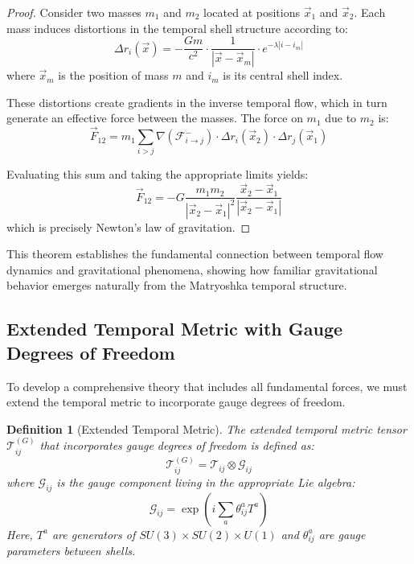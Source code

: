 \documentclass[12pt,a4paper]{article}
\newtheorem{definition}{Definition}[section]
\begin{document}
\begin{proof}
Consider two masses $m_1$ and $m_2$ located at positions $\vec{x}_1$ and $\vec{x}_2$. Each mass induces distortions in the temporal shell structure according to:
\begin{equation}
\Delta r_i(\vec{x}) = -\frac{G m}{c^2} \cdot \frac{1}{|\vec{x} - \vec{x}_m|} \cdot e^{-\lambda |i - i_m|}
\end{equation}
where $\vec{x}_m$ is the position of mass $m$ and $i_m$ is its central shell index.

These distortions create gradients in the inverse temporal flow, which in turn generate an effective force between the masses. The force on $m_1$ due to $m_2$ is:
\begin{equation}
\vec{F}_{12} = m_1 \sum_{i > j} \nabla(\mathcal{F}^-_{i \to j}) \cdot \Delta r_i(\vec{x}_2) \cdot \Delta r_j(\vec{x}_1)
\end{equation}

Evaluating this sum and taking the appropriate limits yields:
\begin{equation}
\vec{F}_{12} = -G \frac{m_1 m_2}{|\vec{x}_2 - \vec{x}_1|^2} \frac{\vec{x}_2 - \vec{x}_1}{|\vec{x}_2 - \vec{x}_1|}
\end{equation}
which is precisely Newton's law of gravitation.
\end{proof}

This theorem establishes the fundamental connection between temporal flow dynamics and gravitational phenomena, showing how familiar gravitational behavior emerges naturally from the Matryoshka temporal structure.

\subsection{Extended Temporal Metric with Gauge Degrees of Freedom}
\label{subsec:extended-metric}

To develop a comprehensive theory that includes all fundamental forces, we must extend the temporal metric to incorporate gauge degrees of freedom.

\begin{definition}[Extended Temporal Metric]
\label{def:extended-metric}
The extended temporal metric tensor $\mathcal{T}_{ij}^{(G)}$ that incorporates gauge degrees of freedom is defined as:
\begin{equation}
\mathcal{T}_{ij}^{(G)} = \mathcal{T}_{ij} \otimes \mathcal{G}_{ij}
\end{equation}
where $\mathcal{G}_{ij}$ is the gauge component living in the appropriate Lie algebra:
\begin{equation}
\mathcal{G}_{ij} = \exp\left(i\sum_a \theta_{ij}^a T^a\right)
\end{equation}
Here, $T^a$ are generators of $SU(3) \times SU(2) \times U(1)$ and $\theta_{ij}^a$ are gauge parameters between shells.
\end{definition}
\end{document}
